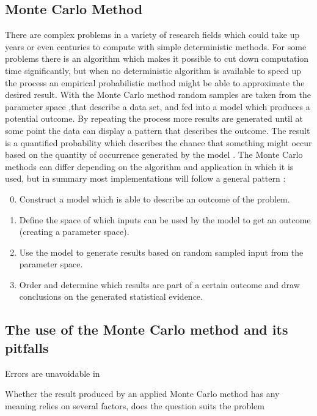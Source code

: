 \subsection{Monte Carlo Method}
There are complex problems in a variety of research fields which could take up years or even centuries to compute with simple deterministic methods. For some problems there is an algorithm which makes it possible to cut down computation time significantly, but when no deterministic algorithm is available to speed up the process an empirical probabilistic method might be able to approximate the desired result. With the Monte Carlo method random samples are taken from the parameter space ,that describe a data set, and fed into a model which produces a potential outcome. By repeating the process more results are generated until at some point the data can display a pattern that describes the outcome. The result is a quantified probability which describes the chance that something might occur based on the quantity of occurrence generated by the model \cite{}.
\newline
\newline
The Monte Carlo methods can differ depending on the algorithm and application in which it is used, but in summary most implementations will follow a general pattern \cite{}:
\begin{enumerate}
	\setcounter{enumi}{-1}
	\item Construct a model which is able to describe an outcome of the problem.
	\item Define the space of which inputs can be used by the model to get an outcome (creating a parameter space). 
	\item Use the model to generate results based on random sampled input from the parameter space.
	\item Order and determine which results are part of a certain outcome and draw conclusions on the generated statistical evidence.
\end{enumerate}

\label{subsec:Monte_Carlo_Method}

\subsection{The use of the Monte Carlo method and its pitfalls}
Errors are unavoidable in

Whether the result produced by an applied Monte Carlo method has any meaning relies on several factors, does the question suits the problem

